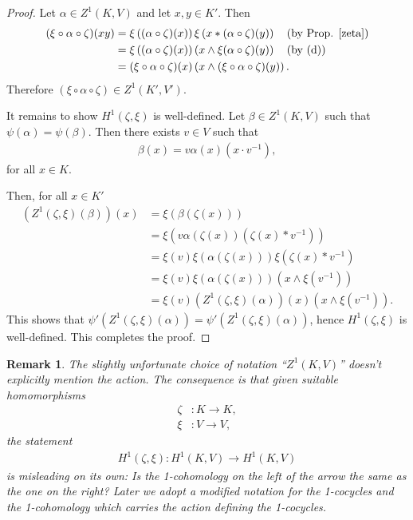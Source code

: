 \documentclass[12pt, a4paper]{amsart}
\newtheorem{remark}{Remark}
\begin{document}
\begin{proof}
	Let $\alpha \in Z^1(K, V)$ and let $x,y \in K'$. Then
	\begin{align*}
		(\xi \circ \alpha \circ \zeta)(xy) &= \xi \left((\alpha \circ \zeta)(x)\right) \xi \left(x \ast (\alpha \circ \zeta)(y)\right) \quad\textrm{(by Prop. \ref{zeta})} \\
			&= \xi \left((\alpha \circ \zeta)(x)\right) \left(x \wedge \xi(\alpha \circ \zeta)(y)\right) \quad\textrm{(by (d))} \\
			&= (\xi \circ \alpha \circ \zeta)(x) \left(x \wedge (\xi \circ \alpha \circ \zeta)(y)\right).
	\end{align*}
	Therefore $(\xi \circ \alpha \circ \zeta) \in Z^1(K', V')$.

	It remains to show $H^1(\zeta, \xi)$ is well-defined. Let $\beta \in Z^1(K, V)$ such that $\psi(\alpha) = \psi(\beta)$. Then there exists $v \in V$ such that
	\begin{align*}
		\beta(x) = v\alpha(x)(x \cdot v^{-1}),
	\end{align*}
	for all $x \in K$.

	Then, for all $x \in K'$
	\begin{align*}
		\left(Z^1(\zeta, \xi)(\beta)\right)(x) &= \xi\left(\beta(\zeta(x))\right) \\
			&= \xi \left( v \alpha(\zeta(x))\left(\zeta(x) \ast v^{-1}\right) \right) \\
			&= \xi(v) \xi(\alpha(\zeta(x))) \xi\left( \zeta(x) \ast v^{-1}\right) \\
			&= \xi(v) \xi(\alpha(\zeta(x)))\left(x \wedge \xi(v^{-1})\right) \\
			&= \xi(v) \left(Z^1(\zeta, \xi)(\alpha)\right)(x) \left(x \wedge \xi(v^{-1})\right).
	\end{align*}
	This shows that $\psi'\left(Z^1(\zeta, \xi)(\alpha)\right) = \psi'\left(Z^1(\zeta, \xi)(\alpha)\right)$, hence $H^1(\zeta, \xi)$ is well-defined. This completes the proof.
\end{proof} 

\begin{remark}
	The slightly unfortunate choice of notation ``$Z^1(K, V)$'' doesn't explicitly mention the action. The consequence is that given suitable homomorphisms
	\begin{align*}
		\zeta&:K \rightarrow K, \\
		\xi&: V \rightarrow V,
	\end{align*}
	the statement
	\begin{align*}
		H^1(\zeta, \xi):H^1(K, V) \rightarrow H^1(K, V)
	\end{align*}
	is misleading on its own: Is the 1-cohomology on the left of the arrow the same as the one on the right? Later we adopt a modified notation for the 1-cocycles and the 1-cohomology which carries the action defining the 1-cocycles.
\end{remark}
\end{document}
